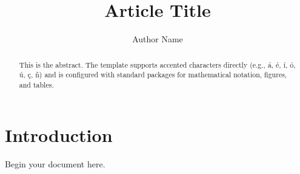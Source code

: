 \documentclass[12pt, a4paper]{article}
\title{Article Title}
\author{Author Name}
\date{}
\begin{document}
\maketitle

\begin{abstract}
    This is the abstract. The template supports accented characters directly (e.g., á, é, í, ó, ú, ç, ñ) and is configured with standard packages for mathematical notation, figures, and tables.
\end{abstract}

\section{Introduction}
Begin your document here.
\end{document}
